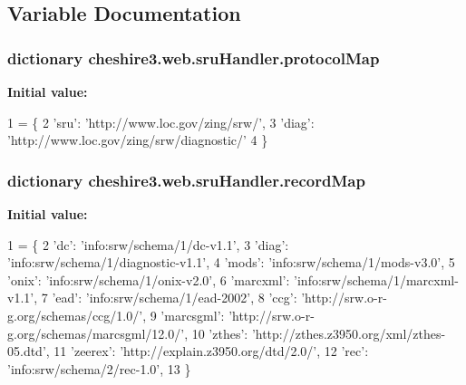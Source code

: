\subsection{Variable Documentation}
\hypertarget{namespacecheshire3_1_1web_1_1sru_handler_a8601f07750c8ec09423065f532584b63}{
\subsubsection[{protocol\-Map}]{\setlength{\rightskip}{0pt plus 5cm}dictionary cheshire3.\-web.\-sru\-Handler.\-protocol\-Map}}\label{namespacecheshire3_1_1web_1_1sru_handler_a8601f07750c8ec09423065f532584b63}
{\bfseries Initial value\-:}
\begin{DoxyCode}
1 = \{
2     \textcolor{stringliteral}{'sru'}: \textcolor{stringliteral}{'http://www.loc.gov/zing/srw/'},
3     \textcolor{stringliteral}{'diag'}: \textcolor{stringliteral}{'http://www.loc.gov/zing/srw/diagnostic/'}
4 \}
\end{DoxyCode}
\hypertarget{namespacecheshire3_1_1web_1_1sru_handler_aaca1ce88ef42cac81a0ab92b33056f94}{
\subsubsection[{record\-Map}]{\setlength{\rightskip}{0pt plus 5cm}dictionary cheshire3.\-web.\-sru\-Handler.\-record\-Map}}\label{namespacecheshire3_1_1web_1_1sru_handler_aaca1ce88ef42cac81a0ab92b33056f94}
{\bfseries Initial value\-:}
\begin{DoxyCode}
1 = \{
2     \textcolor{stringliteral}{'dc'}: \textcolor{stringliteral}{'info:srw/schema/1/dc-v1.1'},
3     \textcolor{stringliteral}{'diag'}: \textcolor{stringliteral}{'info:srw/schema/1/diagnostic-v1.1'},
4     \textcolor{stringliteral}{'mods'}: \textcolor{stringliteral}{'info:srw/schema/1/mods-v3.0'},
5     \textcolor{stringliteral}{'onix'}: \textcolor{stringliteral}{'info:srw/schema/1/onix-v2.0'},
6     \textcolor{stringliteral}{'marcxml'}: \textcolor{stringliteral}{'info:srw/schema/1/marcxml-v1.1'},
7     \textcolor{stringliteral}{'ead'}: \textcolor{stringliteral}{'info:srw/schema/1/ead-2002'},
8     \textcolor{stringliteral}{'ccg'}: \textcolor{stringliteral}{'http://srw.o-r-g.org/schemas/ccg/1.0/'},
9     \textcolor{stringliteral}{'marcsgml'}: \textcolor{stringliteral}{'http://srw.o-r-g.org/schemas/marcsgml/12.0/'},
10     \textcolor{stringliteral}{'zthes'}: \textcolor{stringliteral}{'http://zthes.z3950.org/xml/zthes-05.dtd'},
11     \textcolor{stringliteral}{'zeerex'}: \textcolor{stringliteral}{'http://explain.z3950.org/dtd/2.0/'},
12     \textcolor{stringliteral}{'rec'}: \textcolor{stringliteral}{'info:srw/schema/2/rec-1.0'},
13 \}
\end{DoxyCode}

